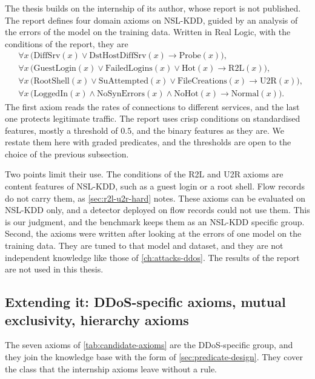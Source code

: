 The thesis builds on the internship of its author, whose report is not
published. The report defines four domain axioms on NSL-KDD, guided by an
analysis of the errors of the model on the training data. Written in Real
Logic, with the conditions of the report, they are
\begin{align}
&\forall x\,\bigl(\mathrm{DiffSrv}(x)\vee\mathrm{DstHostDiffSrv}(x)\rightarrow
  \mathrm{Probe}(x)\bigr),\\
&\forall x\,\bigl(\mathrm{GuestLogin}(x)\vee\mathrm{FailedLogins}(x)\vee
  \mathrm{Hot}(x)\rightarrow\mathrm{R2L}(x)\bigr),\\
&\forall x\,\bigl(\mathrm{RootShell}(x)\vee\mathrm{SuAttempted}(x)\vee
  \mathrm{FileCreations}(x)\rightarrow\mathrm{U2R}(x)\bigr),\\
&\forall x\,\bigl(\mathrm{LoggedIn}(x)\wedge\mathrm{NoSynErrors}(x)\wedge
  \mathrm{NoHot}(x)\rightarrow\mathrm{Normal}(x)\bigr).
\end{align}
The first axiom reads the rates of connections to different services, and the
last one protects legitimate traffic. The report uses crisp conditions on
standardised features, mostly a threshold of $0.5$, and the binary features
as they are. We restate them here with graded predicates, and the
thresholds are open to the choice of the previous subsection.

Two points limit their use. The conditions of the R2L and U2R axioms are
content features of NSL-KDD, such as a guest login or a root shell. Flow
records do not carry them, as \cref{sec:r2l-u2r-hard} notes. These axioms can
be evaluated on NSL-KDD only, and a detector deployed on flow records could not
use them. This is our judgment, and the benchmark keeps them as an NSL-KDD
specific group. Second, the axioms were written after looking at the errors of
one model on the training data. They are tuned to that model and dataset, and
they are not independent knowledge like those of \cref{ch:attacks-ddos}. The
results of the report are not used in this thesis.

\subsection{Extending it: DDoS-specific axioms, mutual exclusivity, hierarchy axioms}
\label{sec:ddos-axioms}

The seven axioms of \cref{tab:candidate-axioms} are the DDoS-specific group,
and they join the knowledge base with the form of \cref{sec:predicate-design}.
They cover the class that the internship axioms leave without a rule.

